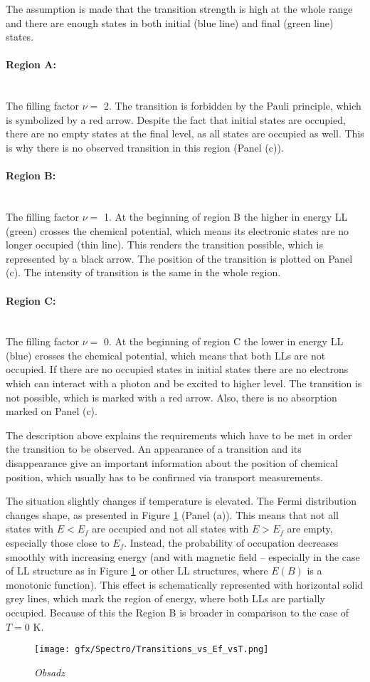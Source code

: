 \documentclass[titlepage,a4paper]{book}
\newcommand{\wciecie}{\quad\phantom{v}}
\newcommand{\myparagraph}[1]{\paragraph{#1}\mbox{}\\}
\begin{document}
The assumption is made that the transition strength is high at the whole range and there are enough states in both initial (blue line) and final (green line) states. 

\myparagraph{Region A:}
\wciecie
The filling factor $\nu =$ 2. The transition is forbidden by the Pauli principle, which is symbolized by a red arrow. Despite the fact that initial states are occupied, there are no empty states at the final level, as all states are occupied as well. This is why there is no observed transition in this region (Panel (c)).

\myparagraph{Region B:}
\wciecie
The filling factor $\nu =$ 1. At the beginning of region B the higher in energy LL (green) crosses the chemical potential, which means its electronic states are no longer occupied (thin line). This renders the transition possible, which is represented by a black arrow. The position of the transition is plotted on Panel (c). The intensity of transition is the same in the whole region.

\myparagraph{Region C:}
\wciecie
The filling factor $\nu =$ 0. At the beginning of region C the lower in energy LL (blue) crosses the chemical potential, which means that both LLs are not occupied. If there are no occupied states in initial states there are no electrons which can interact with a photon and be excited to higher level. The transition is not possible, which is marked with a red arrow. Also, there is no absorption marked on Panel (c).
 
The description above explains the requirements which have to be met in order the transition to be observed. An appearance of a transition and its disappearance give an important information about the position of chemical position, which usually has to be confirmed via transport measurements.

The situation slightly changes if temperature is elevated. The Fermi distribution changes shape, as presented in Figure \ref{fig:Transitions_vs_Ef_vsT} (Panel (a)). This means that not all states with $E < E_f$ are occupied and not all states with $E > E_f$ are empty, especially those close to $E_f$. Instead, the probability of occupation decreases smoothly with increasing energy (and with magnetic field -- especially in the case of LL structure as in Figure \ref{fig:Transitions_vs_Ef_vsT} or other LL structures, where $E(B)$ is a monotonic function). This effect is schematically represented with horizontal solid grey lines, which mark the region of energy, where both LLs are partially occupied. Because of this the Region B is broader in comparison to the case of $T = 0$ K.
\begin{figure}[ht]
	\centering
	\texttt{[image: gfx/Spectro/Transitions\_vs\_Ef\_vsT.png]}
	\vspace{-10pt}
	\caption{\textit{Obsadz}}
	\label{fig:Transitions_vs_Ef_vsT}
\end{figure}
\end{document}
